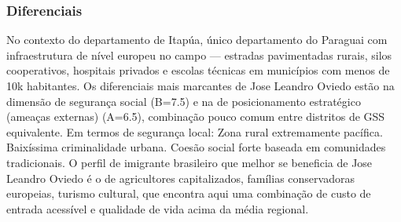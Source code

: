 \subsubsection*{Diferenciais}\label{dif-jose-leandro-oviedo-0716}
No contexto do departamento de Itapúa, único departamento do Paraguai com infraestrutura de nível europeu no campo — estradas pavimentadas rurais, silos cooperativos, hospitais privados e escolas técnicas em municípios com menos de 10k habitantes. Os diferenciais mais marcantes de Jose Leandro Oviedo estão na dimensão de segurança social (B=7.5) e na de posicionamento estratégico (ameaças externas) (A=6.5), combinação pouco comum entre distritos de GSS equivalente. Em termos de segurança local: Zona rural extremamente pacífica. Baixíssima criminalidade urbana. Coesão social forte baseada em comunidades tradicionais. O perfil de imigrante brasileiro que melhor se beneficia de Jose Leandro Oviedo é o de agricultores capitalizados, famílias conservadoras europeias, turismo cultural, que encontra aqui uma combinação de custo de entrada acessível e qualidade de vida acima da média regional.
